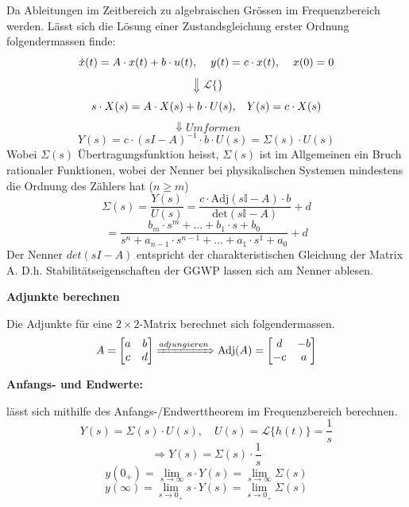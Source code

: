             Da Ableitungen im Zeitbereich zu algebraischen Grössen im Frequenzbereich werden. Lässt sich die Lösung einer Zustandsgleichung erster Ordnung folgendermassen finde:
             \[
             \dot{x}(t) = A \cdot x(t) + b \cdot u(t), \hspace{4mm} y(t) = c \cdot x(t), \hspace{4mm} x(0) = 0 \]
             \[
            \Downarrow{\mathcal{L\{\}}}
            \]
            \[
            s\cdot X(s) = A \cdot X(s) + b\cdot U(s), \hspace{3mm} Y(s) = c\cdot X(s)
            \]
            \[
            \Downarrow{Umformen}
            \]
            \[
            Y(s) = c\cdot (sI-A)^{-1}\cdot b \cdot U(s) = \Sigma(s) \cdot U(s)
            \]
            Wobei $\Sigma(s)$ Übertragungsfunktion heisst, $\Sigma(s)$ ist im Allgemeinen ein Bruch rationaler Funktionen, wobei der Nenner bei physikalischen Systemen mindestens die Ordnung des Zählers hat ($n \geq m$)
            \[\Sigma(s) =   \frac{Y(s)}{U(s)} =\frac{c\cdot \textrm{Adj}(s\mathbb{I}-A)\cdot b}{\textrm{det}(s\mathbb{I} -A)}+d\]
            \[
            = \frac{b_m\cdot s^m+ \hdots + b_1 \cdot s + b_0}{s^n + a_{n-1}\cdot s^{n-1}+\hdots + a_1\cdot s^{1} + a_0} +d\]
            Der Nenner $det(sI-A)$ entspricht der charakteristischen Gleichung der Matrix A. D.h. Stabilitätseigenschaften der GGWP lassen sich am Nenner ablesen.
        
            \textbf{Adjunkte berechnen}
            
            Die Adjunkte für eine $2 \times 2 $-Matrix berechnet sich folgendermassen. 
            \[
            A = \begin{bmatrix}
            a & b \\ c & d
            \end{bmatrix}
            \xRightarrow{adjungieren}
            \textrm{Adj}(A) = \begin{bmatrix}
            d & -b \\ -c & a
            \end{bmatrix}
            \]
            
            \textbf{Anfangs- und Endwerte:}
            
            lässt sich mithilfe des Anfangs-/Endwerttheorem im Frequenzbereich berechnen.
            \[Y(s)=\Sigma(s)\cdot U(s), \quad U(s) = \mathcal{L}\{h(t)\} = \frac{1}{s}\]
            \[\Rightarrow Y(s)=\Sigma(s)\cdot\frac{1}{s}\]
            \[y(0_+) = \lim_{s\to\infty}s\cdot Y(s)=\lim_{s\to\infty}\Sigma(s)\]
            \[y(\infty) = \lim_{s\to0_+}s\cdot Y(s)=\lim_{s\to0_+}\Sigma(s)\]
            
